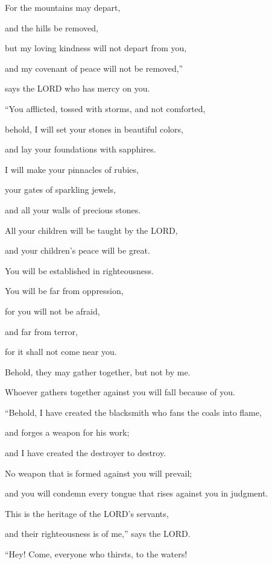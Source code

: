 \myverse{}For the mountains may depart,

and the hills be removed,

but my loving kindness will not depart from you,

and my covenant of peace will not be removed,”

says the LORD who has mercy on you.


\vspace{\baselineskip} \myverse{}“You afflicted, tossed with storms, and not comforted,

behold, I will set your stones in beautiful colors,

and lay your foundations with sapphires.

\myverse{}I will make your pinnacles of rubies,

your gates of sparkling jewels,

and all your walls of precious stones.

\myverse{}All your children will be taught by the LORD,

and your children’s peace will be great.

\myverse{}You will be established in righteousness.

You will be far from oppression,

for you will not be afraid,

and far from terror,

for it shall not come near you.

\myverse{}Behold, they may gather together, but not by me.

Whoever gathers together against you will fall because of you.


\vspace{\baselineskip} \myverse{}“Behold, I have created the blacksmith who fans the coals into
flame,

and forges a weapon for his work;

and I have created the destroyer to destroy.

\myverse{}No weapon that is formed against you will prevail;

and you will condemn every tongue that rises against you in judgment.

This is the heritage of the LORD’s servants,

and their righteousness is of me,” says the LORD.


\mychapter{} \myverse*{}“Hey! Come, everyone who thirsts, to the waters!

